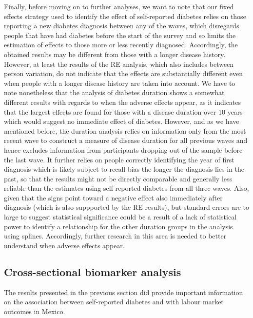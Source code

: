 \documentclass[12pt,english,british]{article}
\begin{document}
Finally, before moving on to further analyses, we want to note that our fixed effects strategy used to identify the effect of self-reported diabetes relies on those reporting a new diabetes diagnosis between any of the waves, which disregards people that have had diabetes before the start of the survey and so limits the estimation of effects to those more or less recently diagnosed. Accordingly, the obtained results may be different from those with a longer disease history. However, at least the results of the \ac{RE} analysis, which also includes between person variation, do not indicate that the effects are substantially different even when people with a longer disease history are taken into account. We have to note nonetheless that the analysis of diabetes duration shows a somewhat different results with regards to when the adverse effects appear, as it indicates that the largest effects are found for those with a disease duration over 10 years which would suggest no immediate effect of diabetes. However, and as we have mentioned before, the duration analysis relies on information only from the most recent wave to construct a measure of disease duration for all previous waves and hence excludes information from participants dropping out of the sample before the last wave. It further relies on people correctly identifying the year of first diagnosis which is likely subject to recall bias the longer the diagnosis lies in the past, so that the results might not be directly comparable and generally less reliable than the estimates using self-reported diabetes from all three waves. Also, given that the signs point toward a negative effect also immediately after diagnosis (which is also suppported by the \ac{RE} results), but standard errors are to large to suggest statistical significance could be a result of a lack of statistical power to identify a relationship for the other duration groups in the analysis using splines. Accordingly, further research in this area is needed to better understand when adverse effects appear.
  

\subsection{Cross-sectional biomarker analysis}

The results presented in the previous section did provide important
information on the association between self-reported diabetes and
with labour market outcomes in Mexico.
\end{document}

